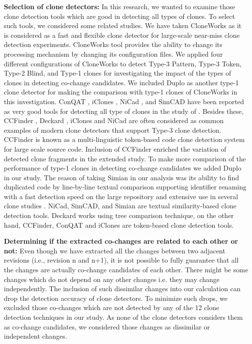 \documentclass[review]{elsarticle}
\begin{document}
\vspace{1mm}
\textbf{Selection of clone detectors:} In this research, we wanted to examine those clone detection tools which are good in detecting all types of clones. To select such tools, we considered some related studies. We have taken CloneWorks \cite{CloneWorks-Jeff} as it is considered as a fast and flexible clone detector for large-scale near-miss clone detection experiments. CloneWorks tool provides the ability to change its processing mechanism by changing its configuration files. We applied four different configurations of CloneWorks to detect Type-3 Pattern, Type-3 Token, Type-2 Blind, and Type-1 clones for investigating the impact of the types of clones in detecting co-change candidates. We included Duplo \cite{DuploCloneDetection} as another type-1 clone detector for making the comparison with type-1 clones of CloneWorks in this investigation.  ConQAT \citep{conqat-clone-detecion}, iClones \cite{4812755iclones}, NiCad \citep{5970189Nicad}, and SimCAD \cite{6613857Simcad} have been reported as very good tools for detecting all type of clones in the study of \citet{jeff-evaluating}. Besides these, CCFinder \cite{CCFinderCloneDetection}, Deckard \cite{4222572Deckard}, iClones and NiCad are often considered as common examples of modern clone detectors that support Type-3 clone detection. CCFinder is known as a multi-linguistic token-based code clone detection system for large scale source code. Inclusion of CCFinder enriched the variation of detected clone fragments in the extended study.  To make more comparison of the performance of type-1 clones in detecting co-change candidates we added Duplo in our study. The reason of taking Simian \cite{simianlink} in our analysis was its ability to find duplicated code by line-by-line textual comparison supporting identifier renaming with a fast detection speed on the large repository and extensive use in several clone studies \cite{simian-used-1, Wang-2013-SBC-2491411-2491420, impact-clone-maintenance, Cheung-clones-javascript, cloning-gnome-project}. NiCad, SimCAD, and Simian are textual similarity-based clone detection tools. Deckard works using tree comparison technique, on the other hand, CCFinder, ConQAT and iClones are token-based clone detection tools.

\vspace{1mm}
\textbf{Determining if the extracted co-changes are related to each other or not:} Even though we have extracted all the changes between two adjacent revisions (i.e., revision n and n+1), it is not possible to fully guarantee that all the changes are actually co-change candidates of each other. There might be some changes which do not depend on any other changes i.e. they may change independently. The inclusion of such dissimilar changes into our calculation can drop the detection accuracy of clone detectors. To minimize such drops, we excluded those co-changes which are not detected by any of the 12 clone detection techniques in our study. As none of the clone detectors considers them as co-change candidates, we considered those changes as dissimilar or independent changes. 
\end{document}
